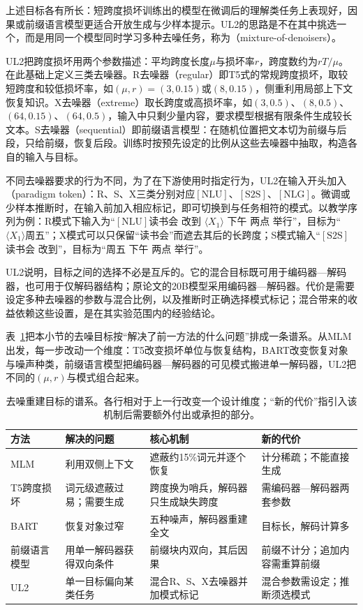 上述目标各有所长：短跨度损坏训练出的模型在微调后的理解类任务上表现好，因果或前缀语言模型更适合开放生成与少样本提示。UL2的思路是不在其中挑选一个，而是用同一个模型同时学习多种去噪任务，称为（mixture-of-denoisers）。

UL2把跨度损坏用两个参数描述：平均跨度长度$\mu$与损坏率$r$，跨度数约为$rT/\mu$。在此基础上定义三类去噪器。R去噪器（regular）即T5式的常规跨度损坏，取较短跨度和较低损坏率，如$(\mu,r)=(3,0.15)$或$(8,0.15)$，侧重利用局部上下文恢复知识。X去噪器（extreme）取长跨度或高损坏率，如$(3,0.5)$、$(8,0.5)$、$(64,0.15)$、$(64,0.5)$，输入中只剩少量内容，要求模型根据有限条件生成较长文本。S去噪器（sequential）即前缀语言模型：在随机位置把文本切为前缀与后段，只给前缀，恢复后段。训练时按预先设定的比例从这些去噪器中抽取，构造各自的输入与目标。

不同去噪器要求的行为不同，为了在下游使用时指定行为，UL2在输入开头加入（paradigm token）：R、S、X三类分别对应$[\mathrm{NLU}]$、$[\mathrm{S2S}]$、$[\mathrm{NLG}]$。微调或少样本推断时，在输入前加入相应标记，即可切换到与任务相符的模式。以教学序列为例：R模式下输入为“$[\mathrm{NLU}]$读书会 改到 $\langle X_1\rangle$ 下午 两点 举行”，目标为“$\langle X_1\rangle$周五”；X模式可以只保留“读书会”而遮去其后的长跨度；S模式输入“$[\mathrm{S2S}]$读书会 改到”，目标为“周五 下午 两点 举行”。

UL2说明，目标之间的选择不必是互斥的。它的混合目标既可用于编码器—解码器，也可用于仅解码器结构；原论文的20B模型采用编码器—解码器。代价是需要设定多种去噪器的参数与混合比例，以及推断时正确选择模式标记；混合带来的收益依赖这些设置，是在其实验范围内的经验结论。

表~\ref{tab:nlp-llm-objective-denoising}把本小节的去噪目标按“解决了前一方法的什么问题”排成一条谱系。从MLM出发，每一步改动一个维度：T5改变损坏单位与恢复结构，BART改变恢复对象与噪声种类，前缀语言模型把编码器—解码器的可见模式搬进单一解码器，UL2把不同的$(\mu,r)$与模式组合起来。

\begin{table}[htbp]
 \small
 \begin{tabularx}{\linewidth}{@{}p{22mm}XXX@{}}
  \toprule
  方法 & 解决的问题 & 核心机制 & 新的代价\\
  \midrule
  MLM & 利用双侧上下文 & 遮蔽约15\%词元并逐个恢复 & 计分稀疏；不能直接生成\\
  T5跨度损坏 & 词元级遮蔽过易；需要生成 & 跨度换为哨兵，解码器只生成缺失跨度 & 需编码器—解码器两套参数\\
  BART & 恢复对象过窄 & 五种噪声，解码器重建全文 & 目标长，解码计算多\\
  前缀语言模型 & 用单一解码器获得双向条件 & 前缀块内双向，其后因果 & 前缀不计分；追加内容需重算前缀\\
  UL2 & 单一目标偏向某类任务 & 混合R、S、X去噪器并加模式标记 & 混合参数需设定；推断须选模式\\
  \bottomrule
 \end{tabularx}
 \caption{去噪重建目标的谱系。各行相对于上一行改变一个设计维度；“新的代价”指引入该机制后需要额外付出或承担的部分。}
 \label{tab:nlp-llm-objective-denoising}
\end{table}

